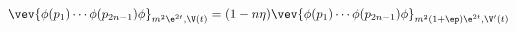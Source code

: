 \begin{equation}
\vev{\phi (p_1) \cdots \phi (p_{2n-1}) \phi}_{m^2 \e^{2t}, \V(t)} = (1
- n \eta) \vev{\phi (p_1) \cdots \phi (p_{2n-1}) \phi}_{m^2 (1 + \ep)
\e^{2t}, \V' (t)} \label{RGGreen}
\end{equation}

